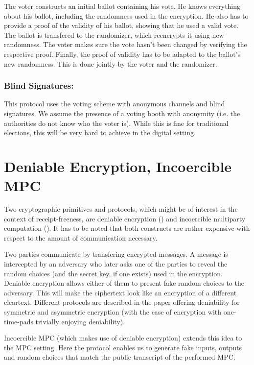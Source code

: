 \documentclass{article}
\begin{document}
The voter constructs an initial ballot containing his vote. He knows everything about his ballot, including the randomness used in the encryption. He also has to provide a proof of the validity of his ballot, showing that he used a valid vote. The ballot is transfered to the randomizer, which reencrypts it using new randomness. The voter makes sure the vote hasn't been changed by verifying the respective proof. Finally, the proof of validity has to be adapted to the ballot's new randomness. This is done jointly by the voter and the randomizer.


\subsubsection{Blind Signatures: \cite{Okamot97}}
This protocol uses the voting scheme with anonymous channels and blind signatures. We assume the presence of a voting booth with anonymity (i.e. the authorities do not know who the voter is). While this is fine for traditional elections, this will be very hard to achieve in the digital setting.



\section{Deniable Encryption, Incoercible MPC}
Two cryptographic primitives and protocols, which might be of interest in the context of receipt-freeness, are deniable encryption (\cite{CDNO97}) and incoercible multiparty computation (\cite{CanGen96}). It has to be noted that both constructs are rather expensive with respect to the amount of communication necessary.

Two parties communicate by transfering encrypted messages. A message is intercepted by an adversary who later asks one of the parties to reveal the random choices (and the secret key, if one exists) used in the encryption. Deniable encryption allows either of them to present fake random choices to the adversary. This will make the ciphertext look like an encryption of a different cleartext.
Different protocols are described in the paper offering deniability for symmetric and asymmetric encryption (with the case of encryption with one-time-pads trivially enjoying deniability).

Incoercible MPC (which makes use of deniable encryption) extends this idea to the MPC setting. Here the protocol enables us to generate fake inputs, outputs and random choices that match the public transcript of the performed MPC.
\end{document}
